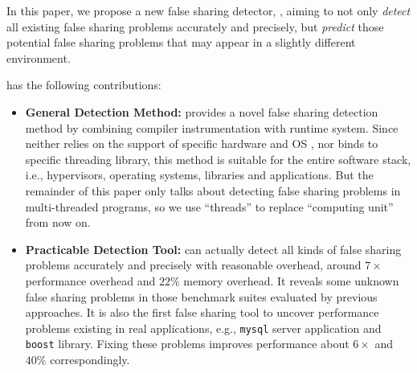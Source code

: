 In this paper, we propose a new false sharing detector, \Predator{}, aiming to
not only {\it detect} all existing false sharing problems accurately and precisely,
but {\it predict} those potential 
false sharing problems that may appear in a slightly different environment. 

\Predator{} has the following contributions:
\begin{itemize}
\item
\textbf{General Detection Method:}\Predator{} provides a novel false sharing detection method by
combining compiler instrumentation with runtime system.
Since \Predator{} neither relies on the support of specific hardware and OS ,
nor binds to specific threading library, 
this method is suitable for the entire software stack, 
i.e., hypervisors, operating systems, libraries and applications.
But the remainder of this paper only talks about detecting false sharing problems in multi-threaded 
programs, so we use ``threads'' to replace ``computing unit'' from now on.

\item
\textbf{Practicable Detection Tool:} \Predator{} can actually detect all kinds of false sharing 
problems accurately and precisely 
with reasonable overhead, around $7\times$ performance overhead and $22\%$ memory overhead. 
It reveals some unknown false sharing problems in those benchmark suites evaluated by 
previous approaches.
It is also the first false sharing tool to uncover performance problems existing in real applications, e.g.,
\texttt{mysql} server application and \texttt{boost} library. Fixing these problems 
improves performance about $6\times$ and $40\%$ correspondingly.


\end{itemize}
